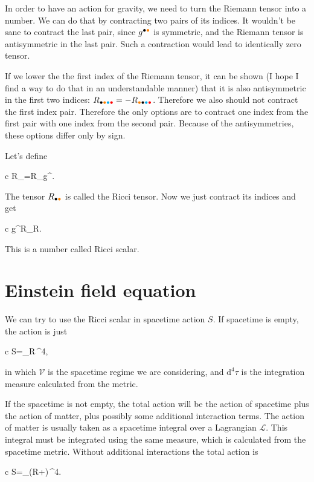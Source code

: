 \documentclass[11pt,oneside%
]{memoir}
\newenvironment{eqna}{\begin{IEEEeqnarray*}{c}}{\end{IEEEeqnarray*}\ignorespacesafterend}
\newcommand{\dd}{\mathrm{d}}
\newcommand{\coa}{{\color{black}\bullet}}
\newcommand{\cob}{{\color{oranssi}\bullet}}
\newcommand{\coc}{{\color{cyan}\bullet}}
\newcommand{\cod}{{\color{red}\bullet}}
\begin{document}
In order to have an action for gravity, we need to turn the Riemann tensor into a number. We can do that by contracting two pairs of its indices. It wouldn't be sane to contract the last pair, since \(g^{\coa\cob}\) is symmetric, and the Riemann tensor is antisymmetric in the last pair. Such a contraction would lead to identically zero tensor.

If we lower the the first index of the Riemann tensor, it can be shown (I hope I find a way to do that in an understandable manner) that it is also antisymmetric in the first two indices: \(R_{\coa\cob\coc\cod}=-R_{\cob\coa\coc\cod}\). Therefore we also should not contract the first index pair. Therefore the only options are to contract one index from the first pair with one index from the second pair. Because of the antisymmetries, these options differ only by sign.

Let's define
\begin{eqna}
R_{\coa\cob}=R_{\coa\coc\cod\cob}g^{\coc\cod}.
\end{eqna}
The tensor \(R_{\coa\cob}\) is called the Ricci tensor. Now we just contract its indices and get
\begin{eqna}
g^{\coa\cob}R_{\coa\cob}\doteq R.
\end{eqna}
This is a number called Ricci scalar.

\section{Einstein field equation}

We can try to use the Ricci scalar in spacetime action \(S\). If spacetime is empty, the action is just
\begin{eqna}
S=\int_{}R\,\dd^4\tau,
\end{eqna}
in which \(\mathcal{V}\) is the spacetime regime we are considering, and \(\dd^4\tau\) is the integration measure calculated from the metric.

If the spacetime is not empty, the total action will be the action of spacetime plus the action of matter, plus possibly some additional interaction terms. The action of matter is usually taken as a spacetime integral over a Lagrangian \(\mathcal{L}\). This integral must be integrated using the same measure, which is calculated from the spacetime metric. Without additional interactions the total action is
\begin{eqna}
S=\int_{}(R+)\,\dd^4\tau.
\end{eqna}
\end{document}
